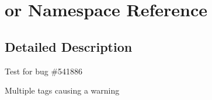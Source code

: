 \hypertarget{namespaceor}{\section{or \-Namespace \-Reference}
\label{namespaceor}
}


\subsection{\-Detailed \-Description}
\-Test for bug \#541886

\-Multiple  tags causing a warning 